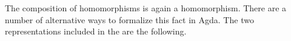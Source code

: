 The composition of homomorphisms is again a homomorphism.  There are a number of
alternative ways to formalize this fact in Agda. The two representations
included in the \ualib are the following.
\ccpad
\begin{code}%
\>[0]\AgdaSpace{}%
\AgdaModule{\AgdaUnderscore{}}\AgdaSpace{}%
\AgdaSymbol{\{}\AgdaSpace{}%
\AgdaSpace{}%
\AgdaSpace{}%
\AgdaSymbol{:}\AgdaSpace{}%
\AgdaSymbol{\}}\AgdaSpace{}%
\<%
\\
%
\\[\AgdaEmptyExtraSkip]%
\>[0][@{}l@{\AgdaIndent{0}}]%
\>[1]\AgdaSpace{}%
\AgdaSymbol{:}\AgdaSpace{}%
\AgdaSymbol{(}\AgdaSpace{}%
\AgdaSymbol{:}\AgdaSpace{}%
\AgdaSpace{}%
\AgdaSpace{}%
\AgdaSymbol{)\{}\AgdaSpace{}%
\AgdaSymbol{:}\AgdaSpace{}%
\AgdaSpace{}%
\AgdaSpace{}%
\AgdaSymbol{\}(}\AgdaSpace{}%
\AgdaSymbol{:}\AgdaSpace{}%
\AgdaSpace{}%
\AgdaSpace{}%
\AgdaSymbol{)}\<%
\\
\>[1][@{}l@{\AgdaIndent{0}}]%
\>[2]%
\>[10]\AgdaSpace{}%
\AgdaSpace{}%
%
\>[19]%
\>[22]\AgdaSpace{}%
\AgdaSpace{}%
%
\>[31]%
\>[34]\AgdaSpace{}%
\AgdaSpace{}%
\<%
\\
%
\\[\AgdaEmptyExtraSkip]%
%
\>[1]\AgdaSpace{}%
\AgdaSpace{}%
\AgdaSymbol{\{}\AgdaSymbol{\}}\AgdaSpace{}%
\AgdaSpace{}%
\AgdaSymbol{(}\AgdaSpace{}%
\AgdaOperator{\AgdaInductiveConstructor{,}}\AgdaSpace{}%
\AgdaSymbol{)}\AgdaSpace{}%
\AgdaSymbol{(}\AgdaSpace{}%
\AgdaOperator{\AgdaInductiveConstructor{,}}\AgdaSpace{}%
\AgdaSymbol{)}\AgdaSpace{}%
\AgdaSymbol{=}\AgdaSpace{}%
\AgdaSpace{}%
\AgdaSpace{}%
\AgdaSpace{}%
\AgdaOperator{\AgdaInductiveConstructor{,}}\AgdaSpace{}%
\AgdaSpace{}%
\<%
\\
%
\\[\AgdaEmptyExtraSkip]%
\>[1][@{}l@{\AgdaIndent{0}}]%
\>[2]\AgdaSpace{}%
\AgdaSymbol{:}\AgdaSpace{}%
\AgdaSpace{}%
\AgdaSpace{}%

\end{code}
